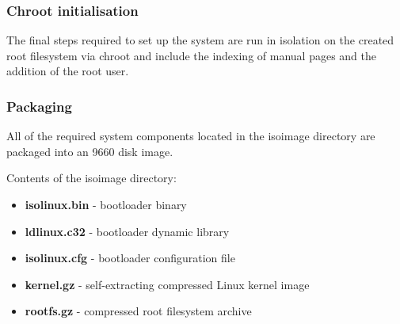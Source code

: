 \subsubsection{Chroot initialisation}

The final steps required to set up the system are run in isolation on the created root filesystem via chroot and include the indexing of manual pages and the addition of the root user.

\subsubsection{Packaging}

All of the required system components located in the isoimage directory are packaged into an  9660 disk image.

Contents of the isoimage directory:

\begin{itemize}
    \item \textbf{isolinux.bin} - bootloader binary
    \item \textbf{ldlinux.c32} - bootloader dynamic library
    \item \textbf{isolinux.cfg} - bootloader configuration file
    \item \textbf{kernel.gz} - self-extracting compressed Linux kernel image
    \item \textbf{rootfs.gz} - compressed root filesystem archive 
\end{itemize}
